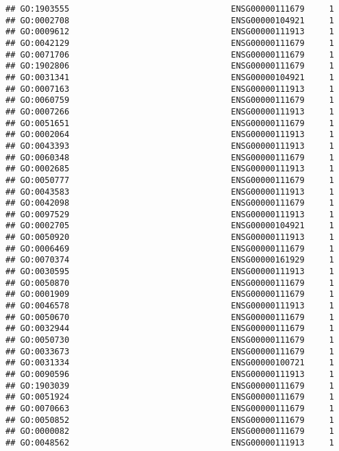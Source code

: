 \documentclass[
]{article}
\begin{document}
\begin{verbatim}
## GO:1903555                                 ENSG00000111679     1
## GO:0002708                                 ENSG00000104921     1
## GO:0009612                                 ENSG00000111913     1
## GO:0042129                                 ENSG00000111679     1
## GO:0071706                                 ENSG00000111679     1
## GO:1902806                                 ENSG00000111679     1
## GO:0031341                                 ENSG00000104921     1
## GO:0007163                                 ENSG00000111913     1
## GO:0060759                                 ENSG00000111679     1
## GO:0007266                                 ENSG00000111913     1
## GO:0051651                                 ENSG00000111679     1
## GO:0002064                                 ENSG00000111913     1
## GO:0043393                                 ENSG00000111913     1
## GO:0060348                                 ENSG00000111679     1
## GO:0002685                                 ENSG00000111913     1
## GO:0050777                                 ENSG00000111679     1
## GO:0043583                                 ENSG00000111913     1
## GO:0042098                                 ENSG00000111679     1
## GO:0097529                                 ENSG00000111913     1
## GO:0002705                                 ENSG00000104921     1
## GO:0050920                                 ENSG00000111913     1
## GO:0006469                                 ENSG00000111679     1
## GO:0070374                                 ENSG00000161929     1
## GO:0030595                                 ENSG00000111913     1
## GO:0050870                                 ENSG00000111679     1
## GO:0001909                                 ENSG00000111679     1
## GO:0046578                                 ENSG00000111913     1
## GO:0050670                                 ENSG00000111679     1
## GO:0032944                                 ENSG00000111679     1
## GO:0050730                                 ENSG00000111679     1
## GO:0033673                                 ENSG00000111679     1
## GO:0031334                                 ENSG00000100721     1
## GO:0090596                                 ENSG00000111913     1
## GO:1903039                                 ENSG00000111679     1
## GO:0051924                                 ENSG00000111679     1
## GO:0070663                                 ENSG00000111679     1
## GO:0050852                                 ENSG00000111679     1
## GO:0000082                                 ENSG00000111679     1
## GO:0048562                                 ENSG00000111913     1

\end{verbatim}
\end{document}
